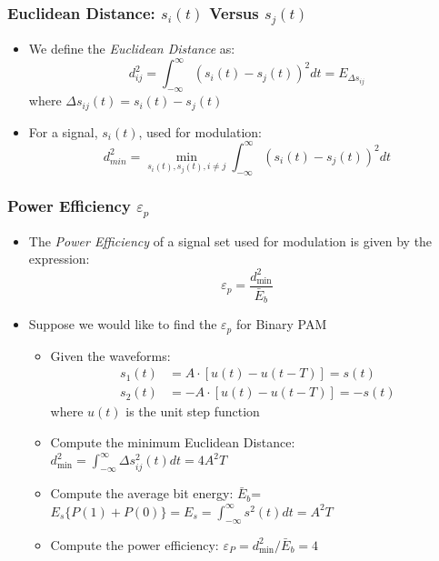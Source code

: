 \documentclass[10pt]{beamer}
\begin{document}
\frame
{
  \frametitle{Euclidean Distance: $s_i(t)$ Versus $s_j(t)$}

    \begin{itemize}
     \item We define the {\it Euclidean Distance} as:
     \begin{equation}
        d_{ij}^2=\int_{-\infty}^{\infty}(s_{i}(t)-s_{j}(t))^2{dt}=E_{\Delta{s_{ij}}}
     \end{equation}
     where $\Delta{s_{ij}}(t)=s_{i}(t)-s_{j}(t)$
     \item For a signal, $s_{i}(t)$, used for modulation:
     \begin{equation}
        d_{min}^2=\min\limits_{s_i(t),s_j(t),i\neq{j}}\int_{-\infty}^{\infty}(s_{i}(t)-s_{j}(t))^2{dt}
     \end{equation}

    \end{itemize}
}

\frame
{
  \frametitle{Power Efficiency $\varepsilon_p$}

  \begin{itemize}
    \item The {\it Power Efficiency} of a signal set used for modulation is given by the expression:
    \begin{equation}
        \varepsilon_{p} = \frac{d_{\min}^2}{\bar{E}_{b}}
    \end{equation}
    \item Suppose we would like to find the $\varepsilon_{p}$ for Binary PAM
    \begin{itemize}
        \item Given the waveforms:
        \begin{equation}
        \begin{split}
            s_1(t)&=A\cdot[u(t)-u(t-T)]=s(t)\\
            s_2(t)&=-A\cdot[u(t)-u(t-T)]=-s(t)
        \end{split}
        \end{equation}
        where $u(t)$ is the unit step function
     \item Compute the minimum Euclidean Distance: $d_{\min}^2=\int_{-\infty}^{\infty} \Delta s_{ij}^2(t) dt= 4A^2T$
     \item Compute the average bit energy: $\bar{E}_{b}$=$E_{s}\{P(1)+P(0)\}=E_{s}=\int_{-\infty}^{\infty} s^2(t) dt=A^2T$
     \item Compute the power efficiency: $\varepsilon_{P} = d_{\min}^2/\bar{E}_{b}=4$
    \end{itemize}
  \end{itemize}

}
\end{document}
